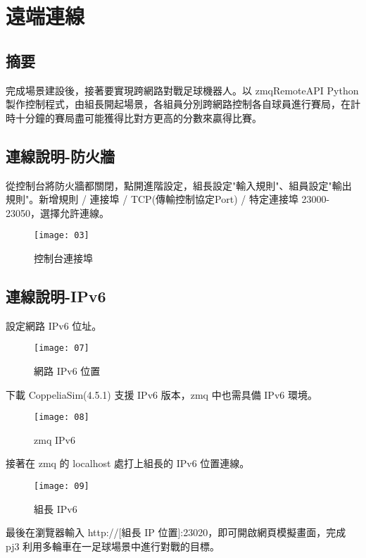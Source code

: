 \chapter{遠端連線}
\renewcommand{\baselinestretch}{10.0} %
\setcounter{page}{20}  %
\fontsize{14pt}{2.5pt}\sectionef
\section{摘要}
  完成場景建設後，接著要實現跨網路對戰足球機器人。以 zmqRemoteAPI Python 製作控制程式，由組長開起場景，各組員分別跨網路控制各自球員進行賽局，在計時十分鐘的賽局盡可能獲得比對方更高的分數來贏得比賽。\\
\section{連線說明-防火牆}
  從控制台將防火牆都關閉，點開進階設定，組長設定"輸入規則"、組員設定"輸出規則"。新增規則 / 連接埠 / TCP(傳輸控制協定Port) / 特定連接埠 23000-23050，選擇允許連線。\\
\begin{figure}[hbt!]
\begin{center}
\texttt{[image: 03]}
\caption{\Large 控制台連接埠}\label{fig.03}
\end{center}
\end{figure}
\section{連線說明-IPv6}
  設定網路 IPv6 位址。\\
\begin{figure}[hbt!]
\begin{center}
\texttt{[image: 07]}
\caption{\Large 網路 IPv6 位置}\label{fig.07}
\end{center}
\end{figure}

  下載 CoppeliaSim(4.5.1) 支援 IPv6 版本，zmq 中也需具備 IPv6 環境。\\
\begin{figure}[hbt!]
\begin{center}
\texttt{[image: 08]}
\caption{\Large zmq IPv6 }\label{fig.08}
\end{center}
\end{figure}

  接著在 zmq 的 localhost 處打上組長的 IPv6 位置連線。\\
\newpage
\begin{figure}[hbt!]
\begin{center}
\texttt{[image: 09]}
\caption{\Large 組長 IPv6 }\label{fig.09}
\end{center}
\end{figure}
  最後在瀏覽器輸入 http://[組長 IP 位置]:23020，即可開啟網頁模擬畫面，完成 pj3 利用多輪車在一足球場景中進行對戰的目標。